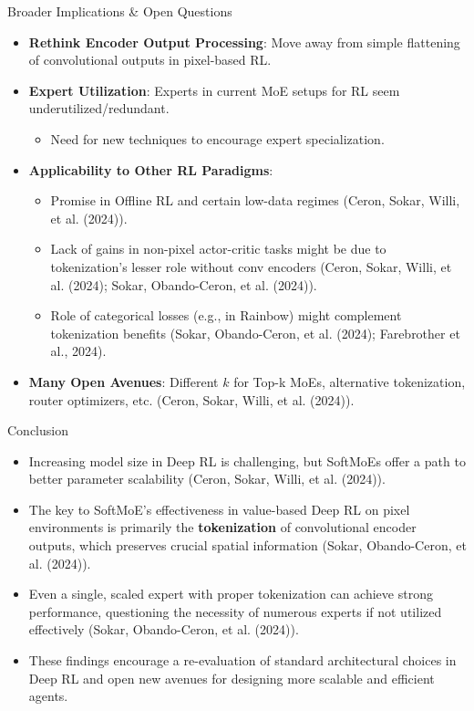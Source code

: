 \documentclass{beamer}
\newcommand{\ceronMoE}{Ceron, Sokar, Willi, et al. (2024)}
\newcommand{\sokarTokenize}{Sokar, Obando-Ceron, et al. (2024)}
\begin{document}
\begin{frame}{Broader Implications \& Open Questions}
  \begin{itemize}
    \item \textbf{Rethink Encoder Output Processing}: Move away from simple flattening of convolutional outputs in pixel-based RL.
    \item \textbf{Expert Utilization}: Experts in current MoE setups for RL seem underutilized/redundant.
        \begin{itemize}
            \item Need for new techniques to encourage expert specialization.
        \end{itemize}
    \item \textbf{Applicability to Other RL Paradigms}:
        \begin{itemize}
            \item Promise in Offline RL and certain low-data regimes (\ceronMoE{}).
            \item Lack of gains in non-pixel actor-critic tasks might be due to tokenization's lesser role without conv encoders (\ceronMoE{}; \sokarTokenize{}).
            \item Role of categorical losses (e.g., in Rainbow) might complement tokenization benefits (\sokarTokenize{}; Farebrother et al., 2024).
        \end{itemize}
    \item \textbf{Many Open Avenues}: Different $k$ for Top-k MoEs, alternative tokenization, router optimizers, etc. (\ceronMoE{}).
  \end{itemize}
\end{frame}

\begin{frame}{Conclusion}
  \begin{itemize}
    \item Increasing model size in Deep RL is challenging, but SoftMoEs offer a path to better parameter scalability (\ceronMoE{}).
    \item The key to SoftMoE's effectiveness in value-based Deep RL on pixel environments is primarily the \textbf{tokenization} of convolutional encoder outputs, which preserves crucial spatial information (\sokarTokenize{}).
    \item Even a single, scaled expert with proper tokenization can achieve strong performance, questioning the necessity of numerous experts if not utilized effectively (\sokarTokenize{}).
    \item These findings encourage a re-evaluation of standard architectural choices in Deep RL and open new avenues for designing more scalable and efficient agents.
  \end{itemize}
\end{frame}
\end{document}
